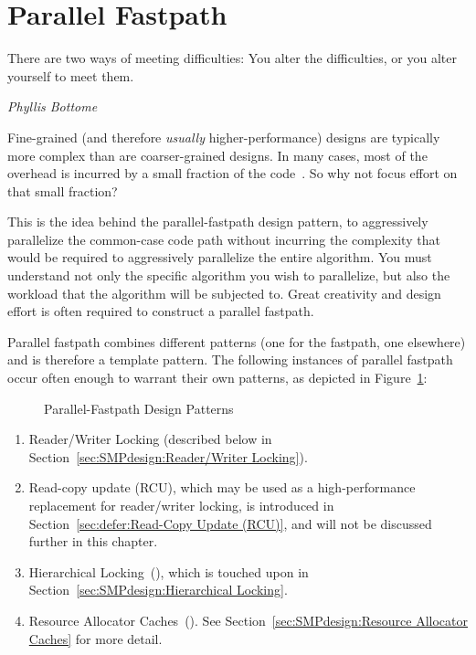 \section{Parallel Fastpath}
\label{sec:SMPdesign:Parallel Fastpath}
%
\epigraph{There are two ways of meeting difficulties: You alter the
	  difficulties, or you alter yourself to meet them.}
	 {\emph{Phyllis Bottome}}

Fine-grained (and therefore \emph{usually} higher-performance)
designs are typically more complex than are coarser-grained designs.
In many cases, most of the overhead is incurred by a small fraction
of the code~\cite{Knuth73}.
So why not focus effort on that small fraction?

This is the idea behind the parallel-fastpath design pattern, to aggressively
parallelize the common-case code path without incurring the complexity
that would be required to aggressively parallelize the entire algorithm.
You must understand not only the specific algorithm you wish
to parallelize, but also the workload that the algorithm will
be subjected to.  Great creativity and design
effort is often required to construct a parallel fastpath.

Parallel fastpath combines different patterns (one for the
fastpath, one elsewhere) and is therefore a template pattern.
The following instances of parallel
fastpath occur often enough to warrant their own patterns,
as depicted in Figure~\ref{fig:SMPdesign:Parallel-Fastpath Design Patterns}:

\begin{figure}[tbp]
\centering
{}
\caption{Parallel-Fastpath Design Patterns}
\label{fig:SMPdesign:Parallel-Fastpath Design Patterns}
\end{figure}

\begin{enumerate}
\item	Reader/Writer Locking
	(described below in Section~\ref{sec:SMPdesign:Reader/Writer Locking}).
\item	Read-copy update (RCU), which may be used as a high-performance
	replacement for reader/writer locking, is introduced in
	Section~\ref{sec:defer:Read-Copy Update (RCU)}, and will not
	be discussed further in this chapter.
\item   Hierarchical Locking~(\cite{McKenney95b}), which is touched upon
	in Section~\ref{sec:SMPdesign:Hierarchical Locking}.
\item	Resource Allocator Caches~(\cite{McKenney95b,McKenney93}).
	See Section~\ref{sec:SMPdesign:Resource Allocator Caches}
	for more detail.
\end{enumerate}

